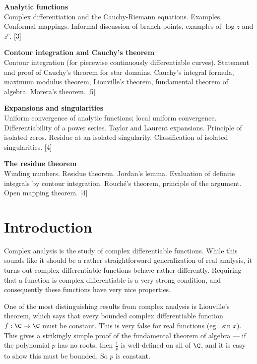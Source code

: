 \documentclass[a4paper]{article}
\begin{document}
\maketitle
{\small
\noindent\textbf{Analytic functions}\\
Complex differentiation and the Cauchy-Riemann equations. Examples. Conformal mappings. Informal discussion of branch points, examples of $\log z$ and $z^c$.\hspace*{\fill} [3]

\vspace{10pt}
\noindent\textbf{Contour integration and Cauchy's theorem}\\
Contour integration (for piecewise continuously differentiable curves). Statement and proof of Cauchy's theorem for star domains. Cauchy's integral formula, maximum modulus theorem, Liouville's theorem, fundamental theorem of algebra. Morera's theorem.\hspace*{\fill} [5]

\vspace{10pt}
\noindent\textbf{Expansions and singularities}\\
Uniform convergence of analytic functions; local uniform convergence. Differentiability of a power series. Taylor and Laurent expansions. Principle of isolated zeros. Residue at an isolated singularity. Classification of isolated singularities.\hspace*{\fill} [4]

\vspace{10pt}
\noindent\textbf{The residue theorem}\\
Winding numbers. Residue theorem. Jordan's lemma. Evaluation of definite integrals by contour integration. Rouch\'e's theorem, principle of the argument. Open mapping theorem.\hspace*{\fill} [4]}

\tableofcontents
\setcounter{section}{-1}
\section{Introduction}
Complex analysis is the study of complex differentiable functions. While this sounds like it should be a rather straightforward generalization of real analysis, it turns out complex differentiable functions behave rather differently. Requiring that a function is complex differentiable is a very strong condition, and consequently these functions have very nice properties.

One of the most distinguishing results from complex analysis is Liouville's theorem, which says that every bounded complex differentiable function $f: \C \to \C$ must be constant. This is very false for real functions (eg. $\sin x$). This gives a strikingly simple proof of the fundamental theorem of algebra --- if the polynomial $p$ has no roots, then $\frac{1}{p}$ is well-defined on all of $\C$, and it is easy to show this must be bounded. So $p$ is constant.
\end{document}
